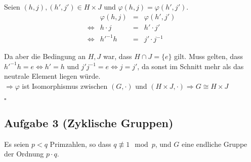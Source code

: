 \documentclass[11pt,a4paper,ngerman]{article}
\begin{document}
\begin{enumerate}[\bfseries a)]
Seien $(h,j), (h',j') \in H \times J$ und $\varphi(h,j) = \varphi(h', j')$.\\
$$
\begin{array}{crcl}
& \varphi(h,j) &=& \varphi(h',j')\\
\Leftrightarrow & h \cdot j &=& h' \cdot j'\\
\Leftrightarrow & h'^{-1} h &=& j' \cdot j^{-1}
\end{array}
$$

Da aber die Bedingung an $H,J$ war, dass $H \cap J = \{ e \}$ gilt. Muss gelten, dass $h'^{-1}h = e \Leftrightarrow h' = h$ und $j'j^{-1} = e \Leftrightarrow j = j'$, da sonst im Schnitt mehr als das neutrale Element liegen würde.\\

$\Rightarrow \varphi$ ist Isomorphismus zwischen $(G, \cdot )$ und $(H \times J, \cdot) \Rightarrow G \cong H \times J$

\mbox{} \hfill $\square$
\end{enumerate}


\subsection*{Aufgabe 3 \mdseries (Zyklische Gruppen)}
Es seien $p < q$ Primzahlen, so dass $q \not\equiv 1 \mod p$, und $G$ eine endliche Gruppe der Ordnung $p \cdot q$.
\end{document}
